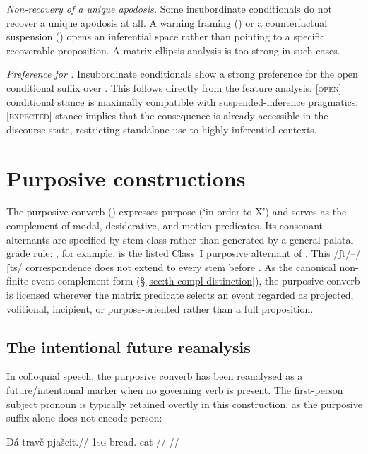 \textit{Non-recovery of a unique apodosis.} Some insubordinate conditionals do
not recover a unique apodosis at all. A warning framing () or a counterfactual suspension () opens an
inferential space rather than pointing to a specific recoverable proposition. A
matrix-ellipsis analysis is too strong in such cases.

\textit{Preference for .} Insubordinate conditionals show a strong
preference for the open conditional suffix over . This follows
directly from the feature analysis: [\textsc{open}] conditional stance is
maximally compatible with suspended-inference pragmatics; [\textsc{expected}]
stance implies that the consequence is already accessible in the discourse
state, restricting standalone use to highly inferential contexts.

\section{Purposive constructions}\label{sec:purposive}

The purposive converb () expresses purpose (`in order to X') and serves
as the complement of modal, desiderative, and motion predicates. Its consonant
alternants are specified by stem class rather than generated by a general
palatal-grade rule: , for example, is the listed Class~I
purposive alternant of . This /ʃt/--/ʃts/ correspondence does not
extend to every stem before . As the canonical non-finite
event-complement form (§\,\ref{sec:th-compl-distinction}), the purposive converb
is licensed wherever the matrix predicate selects an event regarded as
projected, volitional, incipient, or purpose-oriented rather than a full
proposition.

\subsection{The intentional future reanalysis}\label{sec:purp-intentional}

In colloquial speech, the purposive converb has been reanalysed as a
future/intentional marker when no governing verb is present. The first-person
subject pronoun  is typically retained overtly in this construction, as
the purposive suffix alone does not encode person:

\ex
\begingl
\gla Dá travě pjašcit.//
\glb \textsc{1sg} bread.\Ind{} eat-\Purp{}//
\glft {} //
\endgl
\xe

